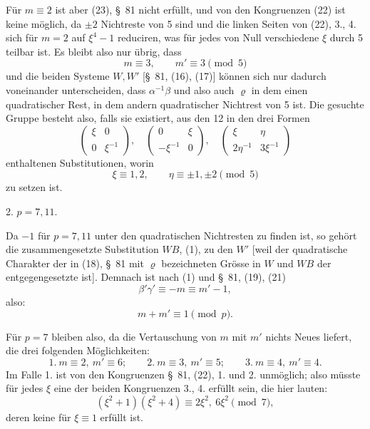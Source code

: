 \documentclass[11pt]{article}
\begin{document}
Für $m\equiv2$ ist aber (23), \S~81 nicht erfüllt, und von den Kongruenzen (22) ist keine möglich, da $\pm2$ Nichtreste von 5 sind und die linken Seiten von (22), 3., 4. sich für $m=2$ auf $\xi^4-1$ reduciren, was für jedes von Null verschiedene $\xi$ durch 5 teilbar ist. Es bleibt also nur übrig, dass
\begin{equation}
 m\equiv3,\qquad m'\equiv3\pmod5
\tag{2}
\end{equation}
und die beiden Systeme $W,W'$ [\S~81, (16), (17)] können sich nur dadurch voneinander unterscheiden, dass $\alpha^{-1}\beta$ und also auch $\varrho$ in dem einen quadratischer Rest, in dem andern quadratischer Nichtrest von 5 ist. Die gesuchte Gruppe besteht also, falls sie existiert, aus den 12 in den drei Formen
\begin{equation}
 \begin{pmatrix}\xi&0\\0&\xi^{-1}\end{pmatrix},\quad
 \begin{pmatrix}0&\xi\\-\xi^{-1}&0\end{pmatrix},\quad
 \begin{pmatrix}\xi&\eta\\2\eta^{-1}&3\xi^{-1}\end{pmatrix}
\tag{3}
\end{equation}
enthaltenen Substitutionen, worin
\[
 \xi\equiv1,2,\qquad \eta\equiv\pm1,\pm2\pmod5
\]
zu setzen ist.

2. $p=7,11$.

Da $-1$ für $p=7,11$ unter den quadratischen Nichtresten zu finden ist, so gehört die zusammengesetzte Substitution $WB$, (1), zu den $W'$ [weil der quadratische Charakter der in (18), \S~81 mit $\varrho$ bezeichneten Grösse in $W$ und $WB$ der entgegengesetzte ist]. Demnach ist nach (1) und \S~81, (19), (21)
\[
 \beta'\gamma'\equiv -m\equiv m'-1,
\]
also:
\begin{equation}
 m+m'\equiv1\pmod p.
\tag{4}
\end{equation}

Für $p=7$ bleiben also, da die Vertauschung von $m$ mit $m'$ nichts Neues liefert, die drei folgenden Möglichkeiten:
\[
 1.\ m\equiv2,\ m'\equiv6;\qquad
 2.\ m\equiv3,\ m'\equiv5;\qquad
 3.\ m\equiv4,\ m'\equiv4.
\]
Im Falle 1. ist von den Kongruenzen \S~81, (22), 1. und 2. unmöglich; also müsste für jedes $\xi$ eine der beiden Kongruenzen 3., 4. erfüllt sein, die hier lauten:
\[
 (\xi^2+1)(\xi^2+4)\equiv2\xi^2,\ 6\xi^2\pmod7,
\]
deren keine für $\xi\equiv1$ erfüllt ist.
\end{document}
